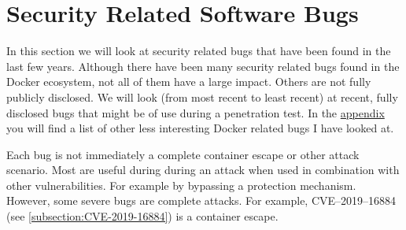 \section{Security Related Software Bugs}\label{section:bugs}
In this section we will look at security related bugs that have been found in the last few years. Although there have been many security related bugs found in the Docker ecosystem, not all of them have a large impact. Others are not fully publicly disclosed. We will look (from most recent to least recent) at recent, fully disclosed bugs that might be of use during a penetration test. In the \hyperref[appendix:CVE-List]{appendix} you will find a list of other less interesting Docker related bugs I have looked at.

Each bug is not immediately a complete container escape or other attack scenario. Most are useful during during an attack when used in combination with other vulnerabilities. For example by bypassing a protection mechanism.
However, some severe bugs are complete attacks. For example, CVE--2019--16884 (see \autoref{subsection:CVE-2019-16884}) is a container escape.









